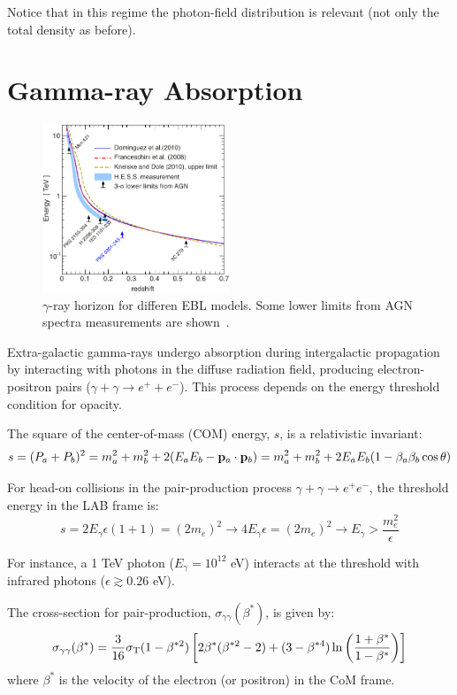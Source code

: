  Notice that in this regime the photon-field  distribution is relevant (not only the total density as before). 
 
\section{Gamma-ray Absorption}

\begin{figure}[t]
\centering
\includegraphics[width=0.5\textwidth]{figures/aa21639-13-fig6.pdf}
\caption{$\gamma$-ray horizon for differen EBL models. Some lower limits from AGN spectra measurements are shown~\cite{HESS2013aa}.}
\end{figure}

Extra-galactic gamma-rays undergo absorption during intergalactic propagation by interacting with photons in the diffuse radiation field, producing electron-positron pairs (\(\gamma + \gamma \rightarrow e^+ + e^-\)). This process depends on the energy threshold condition for opacity.

The square of the center-of-mass (COM) energy, \( s \), is a relativistic invariant:
%
\[
s = (P_a + P_b)^2 = m_a^2 + m_b^2 + 2(E_a E_b - \vb p_a \cdot \vb p_b) = m_a^2 + m_b^2 + 2E_a E_b (1 - \beta_a \beta_b \cos \theta)    
\]

For head-on collisions in the pair-production process \(\gamma + \gamma \rightarrow e^+ e^-\), the threshold energy in the LAB frame is:
%
\[
s = 2 E_\gamma \epsilon (1 + 1) = (2 m_e)^2 \rightarrow 4E_\gamma \epsilon = (2 m_e)^2 \rightarrow E_\gamma > \frac{m_e^2}{\epsilon}    
\]

For instance, a 1 TeV photon (\(E_\gamma = 10^{12}\) eV) interacts at the threshold with infrared photons (\(\epsilon \gtrsim 0.26\) eV).

The cross-section for pair-production, \(\sigma_{\gamma \gamma}(\beta^*)\), is given by:
%
\[
\sigma_{\gamma \gamma}(\beta^*) = \frac{3}{16} \sigma_{\rm T} (1-\beta^{*2}) \left[2 \beta^* (\beta^{*2}-2) + (3-\beta^{*4}) \ln \left( \frac{1+\beta^*}{1-\beta^*} \right) \right]
\]
%
where \(\beta^*\) is the velocity of the electron (or positron) in the CoM frame. 

